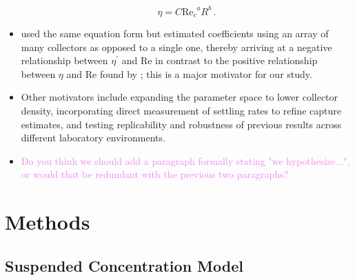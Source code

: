 \documentclass{article}
\newcommand\Rey{\mathrm{Re}}
\begin{document}
\begin{itemize}
        \begin{equation}
            \eta=C{\Rey_c}^{a}R^{b}\,.
            \label{eq:powerlaw}
        \end{equation}
    \item \cite{Fauria_2015} used the same equation form but estimated coefficients using an array of many collectors as opposed to a single one, thereby arriving at a negative relationship between $\eta^\prime$ and $\Rey$ in contrast to the positive relationship between $\eta$ and $\Rey$ found by \cite{Palmer_2004}; this is a major motivator for our study. 
    \item Other motivators include expanding the parameter space to lower collector density, incorporating direct measurement of settling rates to refine capture estimates, and testing replicability and robustness of previous results across different laboratory environments.
    \item \textcolor{violet}{Do you think we should add a paragraph formally stating "we hypothesize...", or would that be redundant with the previous two paragraphs?}
\end{itemize}

\section{Methods}

\subsection{Suspended Concentration Model}
\end{document}
